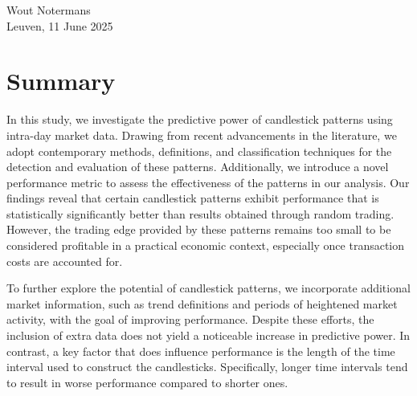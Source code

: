 \begin{flushright}
  Wout Notermans\\
  Leuven, 11 June 2025
\end{flushright}
\newpage

\thispagestyle{empty}
\null
\newpage

\chapter{Summary}
In this study, we investigate the predictive power of candlestick patterns using intra-day market data. Drawing from recent advancements in the literature, we adopt contemporary methods, definitions, and classification techniques for the detection and evaluation of these patterns. Additionally, we introduce a novel performance metric to assess the effectiveness of the patterns in our analysis. Our findings reveal that certain candlestick patterns exhibit performance that is statistically significantly better than results obtained through random trading. However, the trading edge provided by these patterns remains too small to be considered profitable in a practical economic context, especially once transaction costs are accounted for.

To further explore the potential of candlestick patterns, we incorporate additional market information, such as trend definitions and periods of heightened market activity, with the goal of improving performance. Despite these efforts, the inclusion of extra data does not yield a noticeable increase in predictive power. In contrast, a key factor that does influence performance is the length of the time interval used to construct the candlesticks. Specifically, longer time intervals tend to result in worse performance compared to shorter ones.
\vfill
\newpage

\thispagestyle{empty}
\null
\newpage

